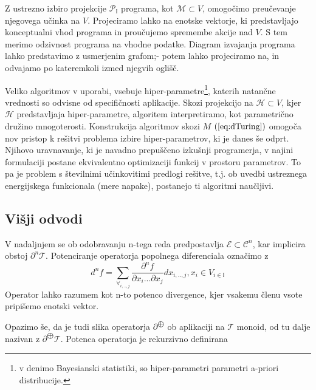 \documentclass{article}
\newcommand{\II}{\mathbb{I}}
\newcommand{\E}{\mathcal{E}}
\newcommand{\T}{\mathcal{T}}
\begin{document}
 Z ustrezno izbiro projekcije $\mathcal{P}_\II$ programa, kot $\mathcal{M}\subset V$, omogočimo preučevanje njegovega učinka na $V$. Projeciramo lahko na enotske vektorje, ki predstavljajo konceptualni vhod programa in proučujemo spremembe akcije nad $V$. S tem merimo odzivnost programa na vhodne podatke. Diagram izvajanja programa lahko predstavimo z usmerjenim grafom;- potem lahko projeciramo na, in odvajamo po kateremkoli izmed njegvih oglišč.
 
  Veliko algoritmov v uporabi, vsebuje hiper-parametre\footnote[2]{v denimo Bayesianski statistiki, so hiper-parametri parametri a-priori distribucije.}, katerih natančne vrednosti so odvisne od specifičnosti aplikacije. Skozi projekcijo na $\mathcal{H}\subset V$, kjer $\mathcal{H}$ predstavljaja hiper-parametre, algoritem interpretiramo, kot parametrično družino mnogoterosti. Konstrukcija algoritmov skozi $M$ $(\ref{eq:dTuring})$ omogoča nov pristop k rešitvi problema izbire hiper-parametrov, ki je danes še odprt. Njihovo uravnavanje, ki je navadno prepuščeno izkušnji programerja, v najini formulaciji postane ekvivalentno optimizaciji funkcij v prostoru parametrov. To pa je problem s številnimi učinkovitimi predlogi rešitve, t.j. ob uvedbi ustreznega energijskega funkcionala (mere napake), postanejo ti algoritmi naučljivi.
 
 \subsection{Višji odvodi}
 
 V nadaljnjem se ob odobravanju n-tega reda predpostavlja $\E\subset\mathcal{C}^n$, kar implicira obstoj $\partial^n\T$. Potenciranje operatorja popolnega diferenciala označimo z
 $$d^nf=\sum_{\forall_{i,..,j}}\frac{\partial^n f}{\partial x_i...\partial x_j}dx_{i,..,j}, x_i\in V_{i\in\II}$$
 Operator lahko razumem kot n-to potenco divergence, kjer vsakemu členu vsote pripišemo enotski vektor.
 
 Opazimo še, da je tudi slika operatorja $\partial^{\bigoplus}$ ob aplikaciji na $\T$ monoid, od tu dalje nazivan z $\partial^{\bigoplus}\T$. Potenca operatorja je rekurzivno definirana
 
\end{document}
